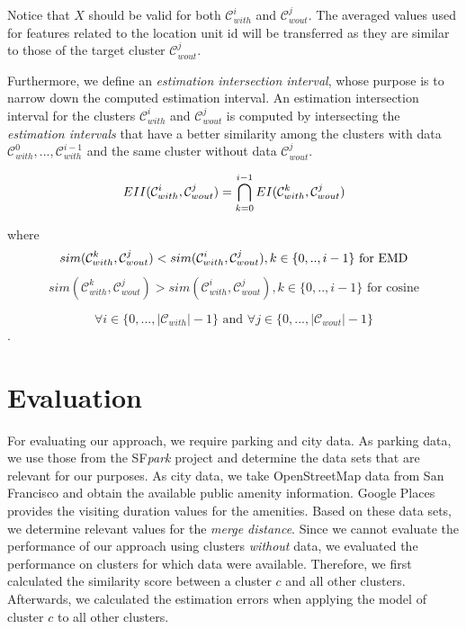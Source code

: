 Notice that $X$ should be valid for both $\mathcal{C}_{with}^i$ and $\mathcal{C}_{wout}^j$. The averaged values used for features related to the location unit id will be transferred as they are similar to those of the target cluster $\mathcal{C}_{wout}^j$.

Furthermore, we define an \textit{estimation intersection interval}, whose purpose is to narrow down the computed estimation interval.
An estimation intersection interval for the clusters $\mathcal{C}_{with}^i$ and $\mathcal{C}_{wout}^j$ is computed by intersecting the \textit{estimation intervals} that have a better similarity among the clusters with data $\mathcal{C}_{with}^{0}, ..., \mathcal{C}_{with}^{i-1}$ and the same cluster without data $\mathcal{C}_{wout}^j$.

\begin{equation}
EII(\mathcal{C}_{with}^i,\mathcal{C}_{wout}^j) = \bigcap_{k=0}^{i-1} EI(\mathcal{C}_{with}^k,\mathcal{C}_{wout}^j) \\
\end{equation}

where
\begin{equation}
sim(\mathcal{C}_{with}^k,\mathcal{C}_{wout}^j) < sim(\mathcal{C}_{with}^i,\mathcal{C}_{wout}^j), k \in \{0,..,i - 1\} \text{ for EMD}\\
\end{equation}
\begin{equation}
sim(\mathcal{C}_{with}^k,\mathcal{C}_{wout}^j) > sim(\mathcal{C}_{with}^i,\mathcal{C}_{wout}^j), k \in \{0,..,i - 1\} \text{ for cosine} 
\end{equation}

$$\forall i \in \{0,...,|\mathcal{C}_{with}|-1\} \text{ and } \forall j \in \{0,...,|\mathcal{C}_{wout}|-1\}$$.

\section{Evaluation}
For evaluating our approach, we require parking and city data. As parking data, we use those from the SF\textit{park} project and determine the data sets that are relevant for our purposes. As city data, we take OpenStreetMap data from San Francisco and obtain the available public amenity information. Google Places provides the visiting duration values for the amenities. Based on these data sets, we determine relevant values for the \textit{merge distance}. Since we cannot evaluate the performance of our approach using clusters \textit{without} data, we evaluated the performance on clusters for which data were available. Therefore, we first calculated the similarity score between a cluster $c$ and all other clusters. Afterwards, we calculated the estimation errors when applying the model of cluster $c$ to all other clusters.

